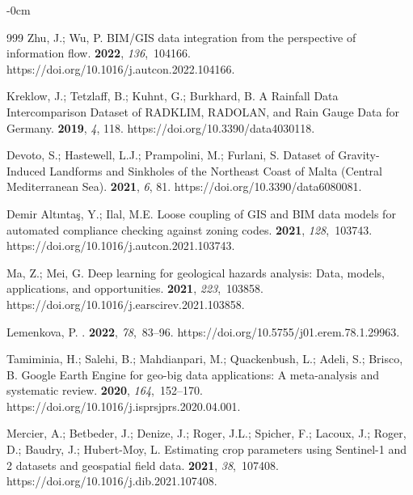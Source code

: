 \documentclass[data,article,accept,pdftex,moreauthors]{Definitions/mdpi}
\begin{document}
{\begin{adjustwidth}{-\extralength}{0cm}
\begin{thebibliography}{999}
Zhu, J.; Wu, P.
\newblock BIM/GIS data integration from the perspective of information flow.
 {\bf 2022}, {\em 136},~104166.
https://doi.org/10.1016/j.autcon.2022.104166.

Kreklow, J.; Tetzlaff, B.; Kuhnt, G.; Burkhard, B.
\newblock A Rainfall Data Intercomparison Dataset of RADKLIM, RADOLAN, and Rain
 Gauge Data for Germany.
 {\bf 2019}, {\em 4}, 118.
https://doi.org/10.3390/data4030118.

Devoto, S.; Hastewell, L.J.; Prampolini, M.; Furlani, S.
\newblock Dataset of Gravity-Induced Landforms and Sinkholes of the Northeast
 Coast of Malta (Central Mediterranean Sea).
 {\bf 2021}, {\em 6}, 81.
https://doi.org/10.3390/data6080081.

{Demir Altıntaş}, Y.; Ilal, M.E.
\newblock Loose coupling of GIS and BIM data models for automated compliance
 checking against zoning codes.
 {\bf 2021}, {\em 128},~103743.
https://doi.org/10.1016/j.autcon.2021.103743.

Ma, Z.; Mei, G.
\newblock Deep learning for geological hazards analysis: Data, models,
 applications, and opportunities.
 {\bf 2021}, {\em 223},~103858.
https://doi.org/10.1016/j.earscirev.2021.103858.

Lemenkova, P.
.
 {\bf 2022},
 {\em 78},~83--96.
https://doi.org/10.5755/j01.erem.78.1.29963.

Tamiminia, H.; Salehi, B.; Mahdianpari, M.; Quackenbush, L.; Adeli, S.; Brisco,
 B.
\newblock Google Earth Engine for geo-big data applications: A meta-analysis
 and systematic review.
 {\bf 2020},
 {\em 164},~152--170.
https://doi.org/10.1016/j.isprsjprs.2020.04.001.

Mercier, A.; Betbeder, J.; Denize, J.; Roger, J.L.; Spicher, F.; Lacoux, J.;
 Roger, D.; Baudry, J.; Hubert-Moy, L.
\newblock Estimating crop parameters using Sentinel-1 and 2 datasets and
 geospatial field data.
 {\bf 2021}, {\em 38},~107408.
https://doi.org/10.1016/j.dib.2021.107408.


\end{thebibliography}
\end{adjustwidth}}
\end{document}
